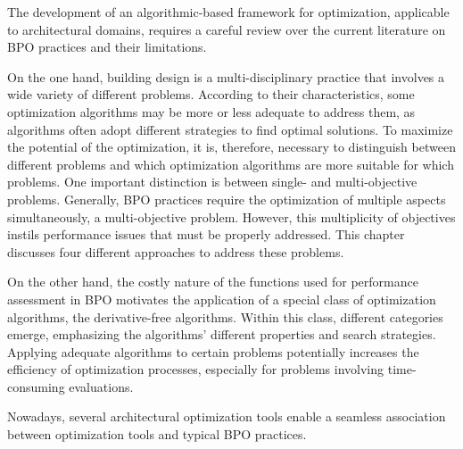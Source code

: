 \cleardoublepage
\label{chap:back}

	The development of an algorithmic-based framework for optimization, applicable to architectural domains, requires a careful review over the current literature on \ac{BPO} practices and their limitations. 
	
	On the one hand, building design is a multi-disciplinary practice that involves a wide variety of different problems. According to their characteristics, some optimization algorithms may be more or less adequate to address them, as algorithms often adopt different strategies to find optimal solutions. To maximize the potential of the optimization, it is, therefore, necessary to distinguish between different problems and which optimization algorithms are more suitable for which problems. One important distinction is between single- and multi-objective problems. Generally, \ac{BPO} practices require the optimization of multiple aspects simultaneously, a multi-objective problem. However, this multiplicity of objectives instils performance issues that must be properly addressed. This chapter discusses four different approaches to address these problems.
	
	On the other hand, the costly nature of the functions used for performance assessment in \ac{BPO} motivates the application of a special class of optimization algorithms, the derivative-free algorithms. Within this class, different categories emerge, emphasizing the algorithms' different properties and search strategies. Applying adequate algorithms to certain problems potentially increases the efficiency of optimization processes, especially for problems involving time-consuming evaluations.
	
	Nowadays, several architectural optimization tools enable a seamless association between optimization tools and typical \ac{BPO} practices. %
	

